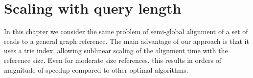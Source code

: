 \chapter{Scaling with query length} \label{ch:seed}

\graphicspath{{\dir/}}

In this chapter we consider the same problem of semi-global alignment of a set
of reads to a general graph reference. The main advantage of our approach is
that it uses a trie index, allowing sublinear scaling of the alignment time with
the reference size. Even for moderate size references, this results in orders of
magnitude of speedup compared to other optimal algorithms.



